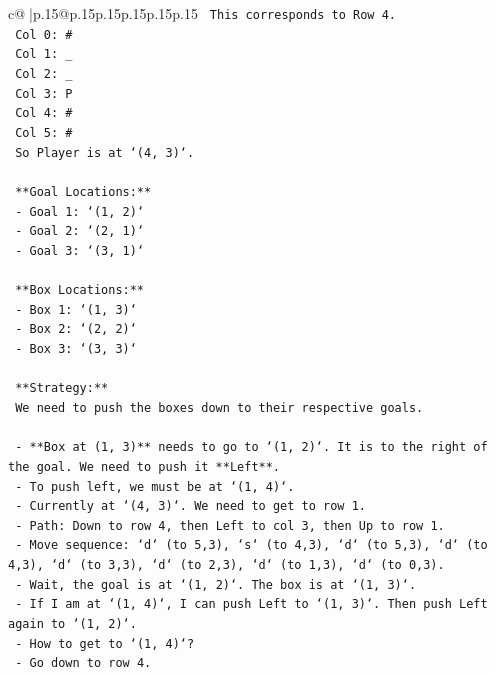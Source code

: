 \documentclass{article}
\begin{document}
{\begin{supertabular}{c@{$\;$}|p{.15\linewidth}@{}p{.15\linewidth}p{.15\linewidth}p{.15\linewidth}p{.15\linewidth}p{.15\linewidth}}
{{{\texttt{    This corresponds to Row 4.} \\
\texttt{    Col 0: \#} \\
\texttt{    Col 1: \_} \\
\texttt{    Col 2: \_} \\
\texttt{    Col 3: P} \\
\texttt{    Col 4: \#} \\
\texttt{    Col 5: \#} \\
\texttt{    So Player is at `(4, 3)`.} \\
\\ 
\texttt{    **Goal Locations:**} \\
\texttt{    {-} Goal 1: `(1, 2)`} \\
\texttt{    {-} Goal 2: `(2, 1)`} \\
\texttt{    {-} Goal 3: `(3, 1)`} \\
\\ 
\texttt{    **Box Locations:**} \\
\texttt{    {-} Box 1: `(1, 3)`} \\
\texttt{    {-} Box 2: `(2, 2)`} \\
\texttt{    {-} Box 3: `(3, 3)`} \\
\\ 
\texttt{    **Strategy:**} \\
\texttt{    We need to push the boxes down to their respective goals.} \\
\\ 
\texttt{    {-} **Box at (1, 3)** needs to go to `(1, 2)`. It is to the right of the goal. We need to push it **Left**.} \\
\texttt{      {-} To push left, we must be at `(1, 4)`.} \\
\texttt{      {-} Currently at `(4, 3)`. We need to get to row 1.} \\
\texttt{      {-} Path: Down to row 4, then Left to col 3, then Up to row 1.} \\
\texttt{      {-} Move sequence: `d` (to 5,3), `s` (to 4,3), `d` (to 5,3), `d` (to 4,3), `d` (to 3,3), `d` (to 2,3), `d` (to 1,3), `d` (to 0,3).} \\
\texttt{      {-} Wait, the goal is at `(1, 2)`. The box is at `(1, 3)`.} \\
\texttt{      {-} If I am at `(1, 4)`, I can push Left to `(1, 3)`. Then push Left again to `(1, 2)`.} \\
\texttt{      {-} How to get to `(1, 4)`?} \\
\texttt{        {-} Go down to row 4.} \\
}}}
\end{supertabular}}
\end{document}
